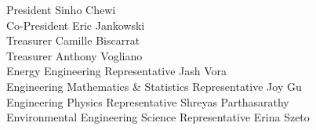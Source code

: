 President \hfill Sinho Chewi \\
Co-President \hfill Eric Jankowski \\
Treasurer \hfill Camille Biscarrat \\
Treasurer \hfill Anthony Vogliano \\
Energy Engineering Representative \hfill Jash Vora \\
Engineering Mathematics \& Statistics Representative \hfill Joy Gu \\
Engineering Physics Representative \hfill Shreyas Parthasarathy \\
Environmental Engineering Science Representative \hfill Erina Szeto

